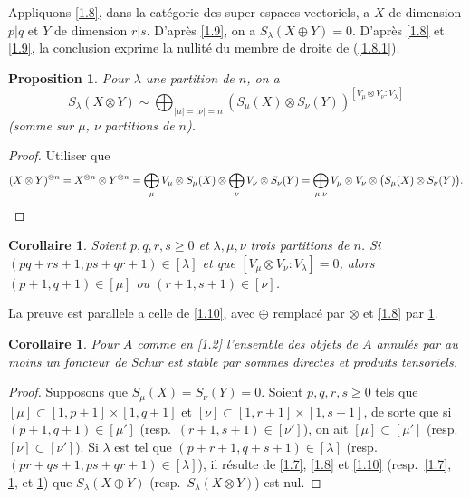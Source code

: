 \documentclass[11pt,a4paper]{article}
\theoremstyle{plain}
\newtheorem{proposition}[theorem]{Proposition}
\newtheorem{corollary}[theorem]{Corollaire}
\theoremstyle{definition}
\begin{document}
Appliquons \ref{1.8}, dans la cat\'egorie des super espaces vectoriels, a $X$ de dimension $p|q$ et $Y$ de dimension $r|s$. D'apr\`es \ref{1.9}, on a $S_\lambda(X\oplus Y)=0$. D'apr\`es \ref{1.8} et \ref{1.9}, la conclusion exprime la nullit\'e du membre de droite de (\ref{1.8.1}).

\begin{proposition}\label{1.11}
Pour $\lambda$ une partition de $n$, on a
\begin{equation}\label{1.11.1}
S_\lambda(X\otimes Y)\sim\bigoplus_{|\mu|=|\nu|=n}(S_\mu(X)\otimes S_\nu(Y))^{[V_\mu\otimes V_\nu:V_\lambda]}
\end{equation}
(somme sur $\mu$, $\nu$ partitions de $n$).
\end{proposition}

\begin{proof}
Utiliser que
\[
(X\otimes Y)^{\otimes n}=X^{\otimes n}\otimes Y^{\otimes n}=\bigoplus_\mu V_\mu\otimes S_\mu(X)\otimes\bigoplus_\nu V_\nu\otimes S_\nu(Y)=\bigoplus_{\mu,\nu}V_\mu\otimes V_\nu\otimes\bigl(S_\mu(X)\otimes S_\nu(Y)\bigr).\qedhere
\]
\end{proof}

\begin{corollary}\label{1.12}
Soient $p,q,r,s\geq0$ et $\lambda,\mu,\nu$ trois partitions de $n$. Si $(pq+rs+1,ps+qr+1)\in[\lambda]$ et que $[V_\mu\otimes V_\nu:V_\lambda]=0$, alors $(p+1,q+1)\in[\mu]$ ou $(r+1,s+1)\in[\nu]$.
\end{corollary}

La preuve est parallele a celle de \ref{1.10}, avec $\oplus$ remplac\'e par $\otimes$ et \ref{1.8} par \ref{1.11}.

\begin{corollary}\label{1.13}
Pour $A$ comme en \ref{1.2} l'ensemble des objets de $A$ annul\'es par au moins un foncteur de Schur est stable par sommes directes et produits tensoriels.
\end{corollary}

\begin{proof}
Supposons que $S_\mu(X)=S_\nu(Y)=0$. Soient $p,q,r,s\geq0$ tels que $[\mu]\subset[1,p+1]\times[1,q+1]$ et $[\nu]\subset[1,r+1]\times[1,s+1]$, de sorte que si $(p+1,q+1)\in[\mu']$ (resp.~$(r+1,s+1)\in[\nu']$), on ait $[\mu]\subset[\mu']$ (resp.~$[\nu]\subset[\nu']$). Si $\lambda$ est tel que $(p+r+1,q+s+1)\in[\lambda]$ (resp.~$(pr+qs+1,ps+qr+1)\in[\lambda]$), il r\'esulte de \ref{1.7}, \ref{1.8} et \ref{1.10} (resp.~\ref{1.7}, \ref{1.11}, et \ref{1.12}) que $S_\lambda(X\oplus Y)$ (resp.~$S_\lambda(X\otimes Y)$) est nul.
\end{proof}
\end{document}
